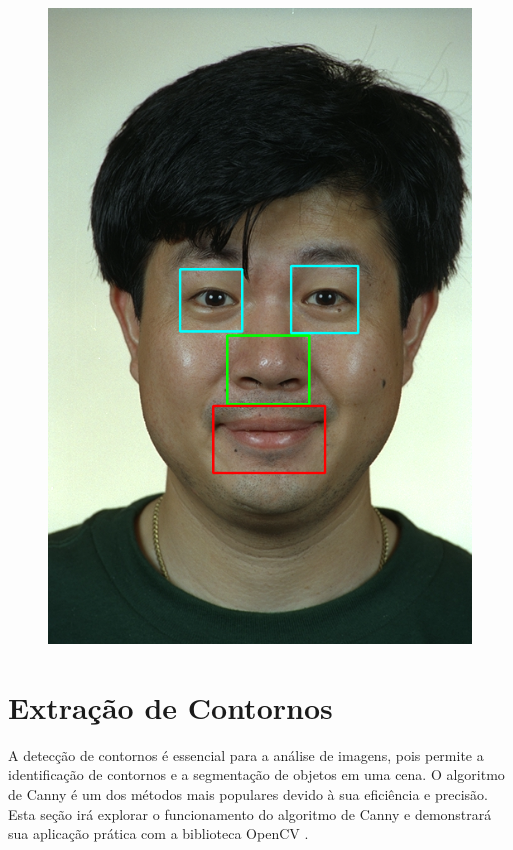 \begin{figure}[h!]
\begin{minipage}[b]{0.33\textwidth}
        \includegraphics[width=0.9\linewidth]{fig/02_detected_features.png}
        \label{fig:caracteristicas}
    \end{minipage}
    \label{fig:deteccao-caracteristicas}
\end{figure}



\section{Extração de Contornos}

A detecção de contornos é essencial para a análise de imagens, pois permite a identificação de contornos e a segmentação de objetos em uma cena. O algoritmo de Canny \cite{Canny} é um dos métodos mais populares devido à sua eficiência e precisão. Esta seção irá explorar o funcionamento do algoritmo de Canny e demonstrará sua aplicação prática com a biblioteca OpenCV \cite{CannyAplicacao}.

